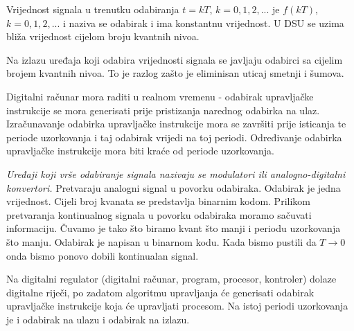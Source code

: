 \documentclass{article}
\newenvironment{defquote}
	{\begin{center}\begin{minipage}{0.9\linewidth}\begin{mdframed}[linewidth=1.2pt]}
		{\end{mdframed}\end{minipage}\end{center}}
\begin{document}
	\begin{defquote}
	Vrijednost signala u trenutku odabiranja $t=kT$, $k=0,1,2,...$ je $f(kT)$, $k=0,1,2,...$ i naziva se odabirak i ima konstantnu vrijednost. U DSU se uzima bliža vrijednost cijelom broju kvantnih nivoa.
	\end{defquote}
	Na izlazu uređaja koji odabira vrijednosti signala se javljaju odabirci sa cijelim brojem kvantnih nivoa. To je razlog zašto je eliminisan uticaj smetnji i šumova.
	\begin{defquote}
		Digitalni računar mora raditi u realnom vremenu - odabirak upravljačke instrukcije se mora generisati prije pristizanja narednog odabirka na ulaz. Izračunavanje odabirka upravljačke instrukcije mora se završiti prije isticanja te periode uzorkovanja i taj odabirak vrijedi na toj periodi. Određivanje odabirka upravljačke instrukcije mora biti kraće od periode uzorkovanja.
	\end{defquote}
	\textit{Uređaji koji vrše odabiranje signala nazivaju se modulatori ili analogno-digitalni konvertori.} Pretvaraju analogni signal u povorku odabiraka. Odabirak je jedna vrijednost. Cijeli broj kvanata se predstavlja binarnim kodom. Prilikom pretvaranja kontinualnog signala u povorku odabiraka moramo sačuvati informaciju. Čuvamo je tako što biramo kvant što manji i periodu uzorkovanja što manju. Odabirak je napisan u binarnom kodu. Kada bismo pustili da $T \to 0$ onda bismo ponovo dobili kontinualan signal.
	\begin{defquote}
		Na digitalni regulator (digitalni računar, program, procesor, kontroler) dolaze digitalne riječi, po zadatom algoritmu upravljanja će generisati odabirak upravljačke instrukcije koja će upravljati procesom. Na istoj periodi uzorkovanja je i odabirak na ulazu i odabirak na izlazu.
	\end{defquote}
\end{document}
